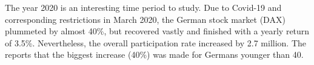 \documentclass[ProjectABM]{subfiles}
\begin{document}





The year 2020 is an interesting time period to study. Due to Covid-19 and corresponding restrictions in March 2020, the German stock market (DAX) plummeted by almost 40\%, but recovered vastly and finished with a yearly return of 3.5\%. Nevertheless, the overall participation rate increased by 2.7 million. The \cite{DAI_2021} reports that the biggest increase (40\%) was made for Germans younger than 40. %
\end{document}
